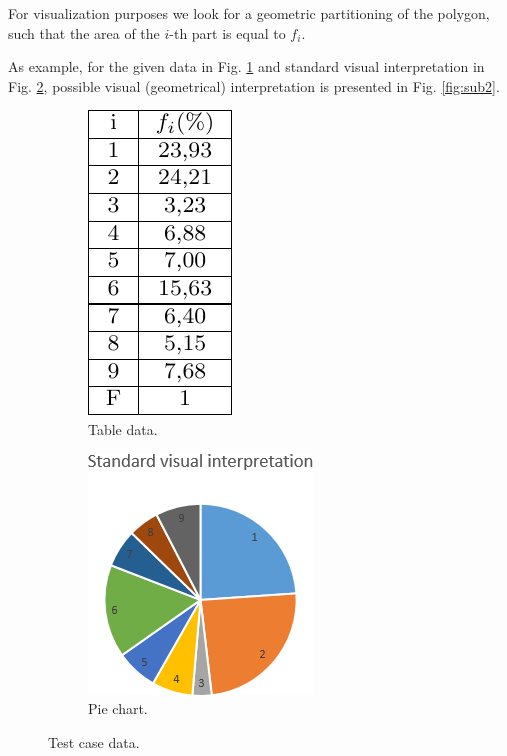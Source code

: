 \documentclass[11pt,leqno]{book}
\begin{document}
For visualization purposes we look for a geometric partitioning of the polygon, such that the area of the $i$-th part is equal to $f_i$.

As example, for the given data in Fig. \ref{fig:sub3} and standard visual interpretation in Fig. \ref{fig:sub4}, possible visual (geometrical) interpretation is presented in Fig. \ref{fig:sub2}.

\begin{figure}[h!]
\centering
\begin{subfigure}{.5\textwidth}
  \centering
  \includegraphics[width=.4\linewidth]{pic07.png}
  \caption{Table data.}
  \label{fig:sub3}
\end{subfigure}%
\begin{subfigure}{.5\textwidth}
  \centering
  \includegraphics[width=.8\linewidth]{pic02.png}
  \caption{Pie chart.}
  \label{fig:sub4}
\end{subfigure}
\caption{Test case data.}
\label{fig:two}
\end{figure}
\FloatBarrier
\end{document}
